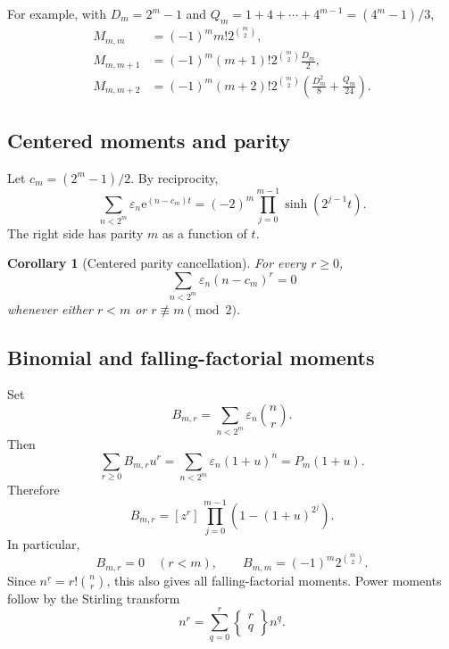 \documentclass[11pt,oneside]{article}
\newtheorem{corollary}[theorem]{Corollary}
\theoremstyle{definition}
\theoremstyle{remark}
\newcommand{\e}{\mathrm e}
\newcommand{\eps}{\varepsilon}
\newcommand{\coeff}[2]{[z^{#1}]\,#2}
\newcommand{\fall}[2]{#1^{\underline{#2}}}
\begin{document}
For example, with $D_m=2^m-1$ and
$Q_m=1+4+\cdots+4^{m-1}=(4^m-1)/3$,
\begin{align}
 M_{m,m}
 &=(-1)^m m!2^{\binom m2},\label{p3:eq:moment-m}\\
 M_{m,m+1}
 &=(-1)^m(m+1)!2^{\binom m2}\frac{D_m}{2},\label{p3:eq:moment-m1}\\
 M_{m,m+2}
 &=(-1)^m(m+2)!2^{\binom m2}
   \left(\frac{D_m^2}{8}+\frac{Q_m}{24}\right).
 \label{p3:eq:moment-m2}
\end{align}

\subsection{Centered moments and parity}

Let $c_m=(2^m-1)/2$.  By reciprocity,
\begin{equation}\label{p3:eq:centered-egf}
 \sum_{n<2^m}\eps_n\e^{(n-c_m)t}
 =(-2)^m\prod_{j=0}^{m-1}
   \sinh\!\left(2^{j-1}t\right).
\end{equation}
The right side has parity $m$ as a function of $t$.

\begin{corollary}[Centered parity cancellation]\label{p3:cor:centered-parity}
For every $r\ge0$,
\begin{equation}\label{p3:eq:centered-parity}
 \sum_{n<2^m}\eps_n(n-c_m)^r=0
\end{equation}
whenever either $r<m$ or $r\not\equiv m\pmod2$.
\end{corollary}

\subsection{Binomial and falling-factorial moments}

Set
\begin{equation}\label{p3:eq:binomial-moment-def}
 B_{m,r}=\sum_{n<2^m}\eps_n\binom nr.
\end{equation}
Then
\begin{equation}\label{p3:eq:binomial-moment-generating}
 \sum_{r\ge0}B_{m,r}u^r
 =\sum_{n<2^m}\eps_n(1+u)^n
 =P_m(1+u).
\end{equation}
Therefore
\begin{equation}\label{p3:eq:binomial-moment-coeff}
 B_{m,r}=\coeff r{\prod_{j=0}^{m-1}
        \left(1-(1+u)^{2^j}\right)}.
\end{equation}
In particular,
\begin{equation}\label{p3:eq:binomial-moment-first}
 B_{m,r}=0\quad(r<m),
 \qquad
 B_{m,m}=(-1)^m2^{\binom m2}.
\end{equation}
Since $\fall nr=r!\binom nr$, this also gives all falling-factorial moments.
Power moments follow by the Stirling transform
\begin{equation}\label{p3:eq:stirling-transform}
 n^r=\sum_{q=0}^{r}\left\{\begin{matrix}r\\q\end{matrix}\right\}
       \fall nq.
\end{equation}
\end{document}
